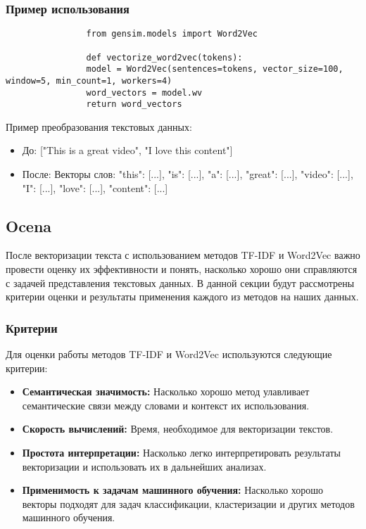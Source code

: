 	
 		\subsubsection{Пример использования}
 			\begin{verbatim}
				from gensim.models import Word2Vec
	
				def vectorize_word2vec(tokens):
				model = Word2Vec(sentences=tokens, vector_size=100, window=5, min_count=1, workers=4)
				word_vectors = model.wv
				return word_vectors
			\end{verbatim}

			Пример преобразования текстовых данных:
			\begin{itemize}
				\item До: ["This is a great video", "I love this content"]
				\item После: Векторы слов: { "this": [...], "is": [...], "a": [...], "great": [...], "video": [...], "I": [...], "love": [...], "content": [...] }
			\end{itemize}
 	
 	\subsection{Ocena}
 		После векторизации текста с использованием методов TF-IDF и Word2Vec важно провести оценку их эффективности и понять, насколько хорошо они справляются с задачей представления текстовых данных. В данной секции будут рассмотрены критерии оценки и результаты применения каждого из методов на наших данных.
 	
 		\subsubsection{Критерии}
 			Для оценки работы методов TF-IDF и Word2Vec используются следующие критерии:

			\begin{itemize}
				\item \textbf{Семантическая значимость:} Насколько хорошо метод улавливает семантические связи 	между словами и контекст их использования.
				\item \textbf{Скорость вычислений:} Время, необходимое для векторизации текстов.
				\item \textbf{Простота интерпретации:} Насколько легко интерпретировать результаты векторизации и использовать их в дальнейших анализах.
				\item \textbf{Применимость к задачам машинного обучения:} Насколько хорошо векторы подходят для задач классификации, кластеризации и других методов машинного обучения.
			\end{itemize}
		
